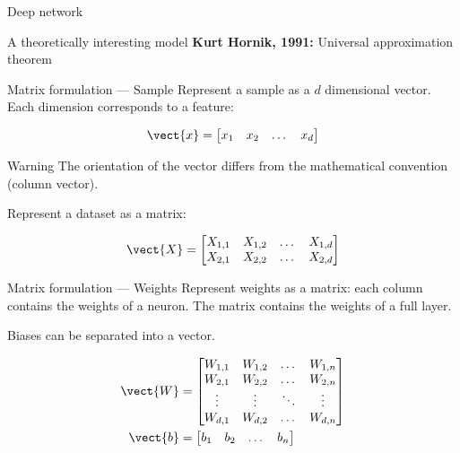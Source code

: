 \begin{frame}{Deep network}
  \centering
\end{frame}

\begin{frame}{A theoretically interesting model}
  \textbf{Kurt Hornik, 1991:} Universal approximation theorem
\end{frame}

\begin{frame}{Matrix formulation --- Sample}
  Represent a sample as a $d$ dimensional vector. Each dimension corresponds to a feature:

  \[
    \vect{x} = \begin{bmatrix}
      x_1 & x_2 & \dots & x_d
    \end{bmatrix}
  \]

  \begin{alertblock}{Warning}
    The orientation of the  vector differs from the mathematical convention (column vector).
  \end{alertblock}

  Represent a dataset as a matrix:

  \[
    \vect{X} = \begin{bmatrix}
      X_{1,1} & X_{1,2} & \dots & X_{1,d} \\
      X_{2,1} & X_{2,2} & \dots & X_{2,d}
    \end{bmatrix}
  \]

\end{frame}

\begin{frame}{Matrix formulation --- Weights}
  Represent weights as a matrix: each column contains the weights of a neuron.
  The matrix contains the weights of a full layer.

  Biases can be separated into a vector.

  \begin{align*}
    \vect{W} & = \begin{bmatrix}
      W_{1,1} & W_{1,2} & \dots  & W_{1,n} \\
      W_{2,1} & W_{2,2} & \dots  & W_{2,n} \\
      \vdots & \vdots & \ddots & \vdots \\
      W_{d,1} & W_{d,2} & \dots  & W_{d,n}
    \end{bmatrix} \\
    \vect{b} & = \begin{bmatrix}
      b_1 & b_2 & \dots & b_n
    \end{bmatrix}
  \end{align*}
\end{frame}

